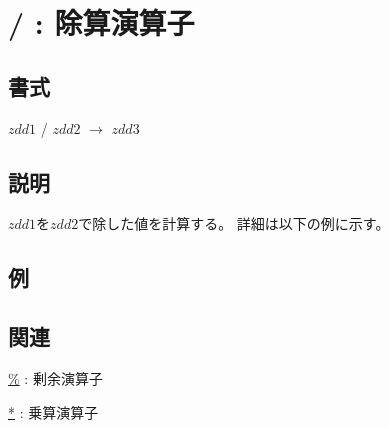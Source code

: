 
\section{/ : 除算演算子\label{sect:quotiment}}
\subsection*{書式}
$zdd1$ / $zdd2$ $\rightarrow$ $zdd3$

\subsection*{説明}
$zdd1$を$zdd2$で除した値を計算する。
詳細は以下の例に示す。

\subsection*{例}


\subsection*{関連}
\hyperref[sect:remainder]{\%} : 剰余演算子

\hyperref[sect:multiply]{*} : 乗算演算子
